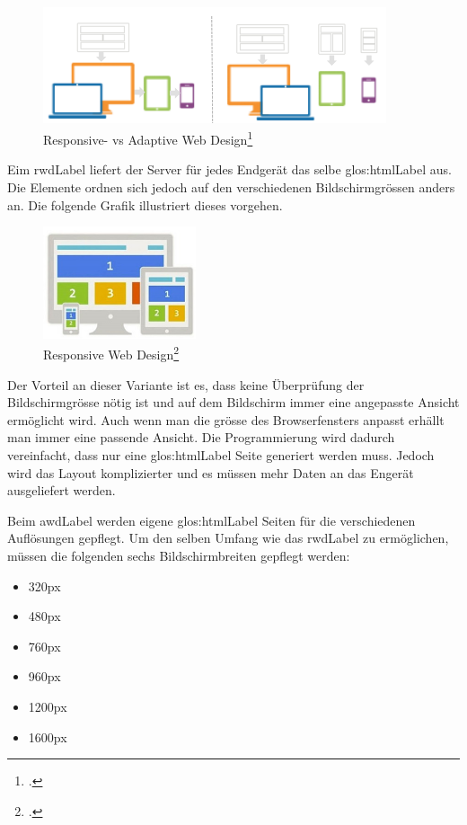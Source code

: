 \begin{figure}[H]
  \centering
  \includegraphics[width=0.9\textwidth]{images/rwd-vs-awd.png}
  \caption{Responsive- vs Adaptive Web Design\footcite{Responsive_vs_Adaptive_Design_for_UI_2015-05-31}}
  \label{fig:requirementsengineerin:endgeraete:responsivevsadaptive:comparision}
\end{figure}

Eim \gls{rwdLabel} liefert der Server für jedes Endgerät das selbe \Gls{glos:htmlLabel} aus. Die Elemente ordnen sich jedoch auf den verschiedenen Bildschirmgrössen anders an. Die folgende Grafik illustriert dieses vorgehen.

\begin{figure}[H]
  \centering
  \includegraphics[width=0.4\textwidth]{images/rwd.jpg}
  \caption{Responsive Web Design\footcite{The_Difference_Between_Adaptive_Design_And_Responsive_Design_2015-05-31}}
  \label{fig:requirementsengineerin:endgeraete:responsivevsadaptive:rwd}
\end{figure}

Der Vorteil an dieser Variante ist es, dass keine Überprüfung der Bildschirmgrösse nötig ist und auf dem Bildschirm immer eine angepasste Ansicht ermöglicht wird. Auch wenn man die grösse des Browserfensters anpasst erhällt man immer eine passende Ansicht. Die Programmierung wird dadurch vereinfacht, dass nur eine \Gls{glos:htmlLabel} Seite generiert werden muss. Jedoch wird das Layout komplizierter und es müssen mehr Daten an das Engerät ausgeliefert werden.

Beim \gls{awdLabel} werden eigene \Gls{glos:htmlLabel} Seiten für die verschiedenen Auflösungen gepflegt. Um den selben Umfang wie das \gls{rwdLabel} zu ermöglichen, müssen die folgenden sechs Bildschirmbreiten gepflegt werden:
\begin{itemize}
\item 320px
\item 480px
\item 760px
\item 960px
\item 1200px
\item 1600px
\end{itemize}

